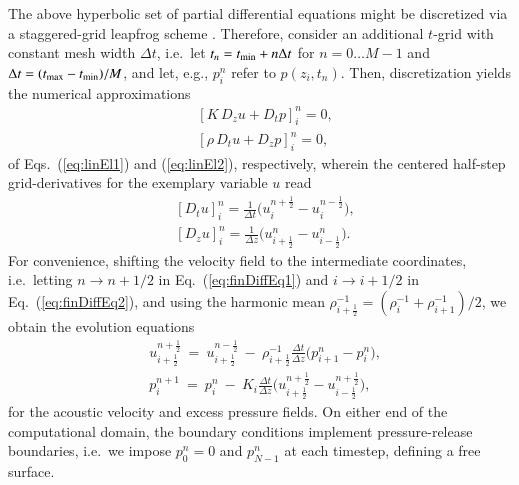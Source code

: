 \documentclass[5p,times,twocolumn]{elsarticle}
\begin{document}
The above hyperbolic set of partial differential equations might be discretized
via a staggered-grid leapfrog scheme \cite{NumRec:1992}.  Therefore, consider
an additional $t$-grid with constant mesh width $\Delta t$, i.e.\ let $t_n =
t_{\rm{min}} + n \Delta t$ for $n=0 \ldots M-1$ and $\Delta t =
(t_{\rm{max}}-t_{\rm{min}})/M$, and let, e.g., $p_i^n$ refer to $p(z_i,t_n)$.
Then, discretization yields the numerical approximations
\begin{subequations}
\begin{align}
  &[ K\, D_z u + D_t p]_i^n = 0,  \label{eq:finDiffEq1}\\ 
  &[\rho\, D_t u + D_z p]_i^n = 0,  \label{eq:finDiffEq2} 
\end{align}
\end{subequations}
of Eqs.\ (\ref{eq:linEl1}) and (\ref{eq:linEl2}), respectively, wherein the
centered half-step grid-derivatives for the exemplary variable $u$ read 
\begin{subequations}
\begin{align}
 &[D_t u]_i^n = \frac{1}{\Delta t}\Big(u_i^{n+\frac{1}{2}} - u_i^{n-\frac{1}{2}}\Big), \label{eq:Dt}\\
 &[D_z u]_i^n  = \frac{1}{\Delta z}\Big(u_{i+\frac{1}{2}}^n - u_{i-\frac{1}{2}}^n \Big). \label{eq:Dz}
\end{align}
\end{subequations}
For convenience, shifting the velocity field to the intermediate
coordinates, i.e.\ letting $n \to n+1/2$ in Eq.\ (\ref{eq:finDiffEq1})
and $i \to i+1/2$ in Eq.\ (\ref{eq:finDiffEq2}), and using the harmonic 
mean $\rho_{i+\frac{1}{2}}^{-1} = (\rho_i^{-1} + \rho_{i+1}^{-1})/2$,
we obtain the evolution equations
\begin{subequations}
\begin{align}
&u_{i+\frac{1}{2}}^{n+\frac{1}{2}} ~=~ u_{i+\frac{1}{2}}^{n-\frac{1}{2}} ~-~ \rho_{i+\frac{1}{2}}^{-1} \frac{\Delta t}{\Delta z} \Big(p_{i+1}^n - p_i^n\Big), \label{eq:evolve_u}\\
&p_{i}^{n+1} ~=~ p_{i}^{n} ~-~ K_{i} \frac{\Delta t}{\Delta z} \Big(u_{i+\frac{1}{2}}^{n+\frac{1}{2}} - u_{i-\frac{1}{2}}^{n+\frac{1}{2}}\Big), \label{eq:evolve_p}
\end{align}
\end{subequations}
for the acoustic velocity and excess pressure fields.
On either end of the computational domain, the boundary conditions implement
pressure-release boundaries, i.e.\ we impose $p_0^n=0$ and $p_{N-1}^n$ at 
each timestep, defining a free surface.
\end{document}
